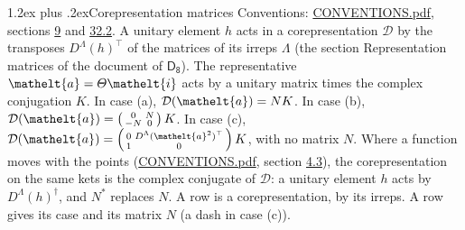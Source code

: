 \documentclass[10pt,a4paper]{article}
\makeatletter
\renewcommand\section{\@startsection{section}{1}{\z@}{-3ex plus -1ex minus -.2ex}%
  {1.2ex plus .2ex}{\normalfont\large\sffamily\bfseries\color{parttitle}}}
\numberwithin{equation}{section}
\newcommand{\eltfont}[1]{{\let\sigma\eltsigma\mathelt{#1}}}
\newcommand{\grp}[1]{\mathsf{#1}}
\newcommand{\elt}[1]{\eltfont{#1}}
\makeatother
\begin{document}
\section{Corepresentation matrices}\label{s:corep_matrices}
Conventions: \href{../../CONVENTIONS.pdf}{CONVENTIONS.pdf}, sections \href{../../../rotation/CONVENTIONS.pdf\#conv.9}{9} and \href{../../CONVENTIONS.pdf\#conv.32.2}{32.2}.
A unitary element $h$ acts in a corepresentation $\mathcal{D}$ by the transposes $D^{\Lambda}(h)^{\top}$ of the matrices of its irreps $\Lambda$ (the section Representation matrices of the document of \href{../../../rotation/data/pdf/D8.pdf}{$\grp{D_{8}}$}). The representative $\elt{a} = \varTheta\elt{i}$ acts by a unitary matrix times the complex conjugation $K$.
In case (a), $\mathcal{D}(\elt{a}) = NK$. In case (b), $\mathcal{D}(\elt{a}) = \left(\begin{smallmatrix} 0 & N \\ -N & 0 \end{smallmatrix}\right) K$. In case (c), $\mathcal{D}(\elt{a}) = \left(\begin{smallmatrix} 0 & D^{\Lambda}(\elt{a}^2)^{\top} \\ 1 & 0 \end{smallmatrix}\right) K$, with no matrix $N$.
Where a function moves with the points (\href{../../CONVENTIONS.pdf}{CONVENTIONS.pdf}, section \href{../../../rotation/CONVENTIONS.pdf\#conv.4.3}{4.3}), the corepresentation on the same kets is the complex conjugate of $\mathcal{D}$: a unitary element $h$ acts by $D^{\Lambda}(h)^{\dagger}$, and $N^{*}$ replaces $N$.
A row is a corepresentation, by its irreps. A row gives its case and its matrix $N$ (a dash in case (c)).
\end{document}
